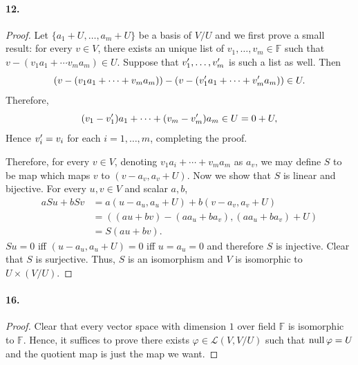   \paragraph{12.}
  \begin{proof}
    Let $\{a_1+U,\dots, a_m+U\}$ be a basis of $V/U$ and we first prove a small
    result: for every $v\in V$, there exists an unique list of $v_1,\dots,v_m\in
    \mathbb{F}$ such that $v - (v_1a_1 + \cdots v_ma_m)\in U$. Suppose that 
    $v_1^\prime,\dots, v_m^\prime$ is such a list as well. Then 
    \[
      (v - (v_1a_1+\cdots+v_ma_m))-(v - (v_1^\prime a_1+\cdots+v_m^\prime a_m)) \in U.
    \]
    Therefore,
    \[
      (v_1-v_1^\prime)a_1+\cdots+(v_m-v_m^\prime)a_m \in U = 0+U,
    \]
    Hence $v_i^\prime = v_i$ for each $i=1,\dots,m$, completing the proof.\par
    Therefore, for every $v\in V$, denoting $v_1a_i+\cdots+v_ma_m$ as $a_v$, we 
    may define $S$ to be map which maps $v$ to $(v-a_v,a_v+U)$. Now we show that
    $S$ is linear and bijective. For every $u,v\in V$ and scalar $a, b$, 
    \begin{align*}
      aSu + bSv
      &= a(u-a_u,a_u+U) + b(v-a_v,a_v+U)  \\
      &= ((au+bv)-(aa_u+ba_v), (aa_u+ba_v) + U) \\
      &= S(au+bv).
    \end{align*}
    $Su = 0$ iff $(u-a_u,a_u+U) = 0$ iff $u=a_u=0$ and therefore $S$ is 
    injective. Clear that $S$ is surjective. Thus, $S$ is an isomorphism and 
    $V$ is isomorphic to $U\times(V/U)$.
  \end{proof}

  \paragraph{16.}
  \begin{proof}
    Clear that every vector space with dimension $1$ over field $\mathbb{F}$ is
    isomorphic to $\mathbb{F}$. Hence, it suffices to prove there exists 
    $\varphi\in\mathcal{L}(V,V/U)$ such that $\operatorname{null}\varphi = U$ and the quotient
    map is just the map we want.
  \end{proof}
